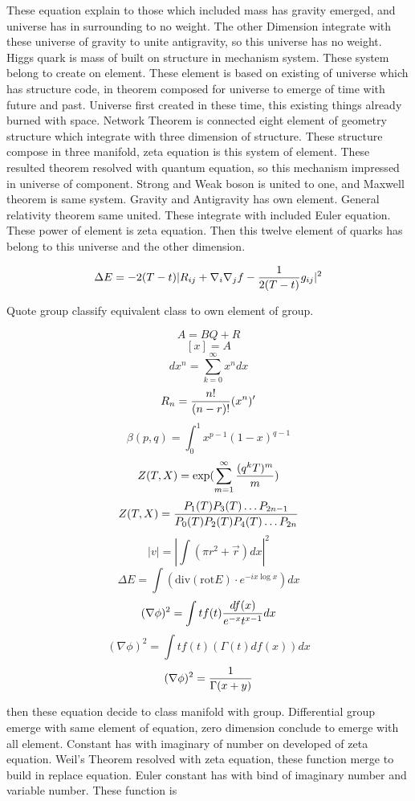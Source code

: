 \documentclass{jsarticle}
\begin{document}
  These equation explain to those which included mass has gravity emerged, and universe has in surrounding to no
weight. The other Dimension integrate with these universe of gravity to unite antigravity, so this universe has no
weight. Higgs quark is mass of built on structure in mechanism system. These system belong to create on element.
These element is based on existing of universe which has structure code, in theorem composed for universe to emerge
of time with future and past. Universe first created in these time, this existing things already burned with space.
Network Theorem is connected eight element of geometry structure which integrate with three dimension of structure.
These structure compose in three manifold, zeta equation is this system of element. These resulted theorem resolved
with quantum equation, so this mechanism impressed in universe of component. Strong and Weak boson is united to one,
and Maxwell theorem is same system. Gravity and Antigravity has own element. General relativity theorem same united.
These integrate with included Euler equation. These power of element is zeta equation. Then this twelve element of
quarks has belong to this universe and the other dimension.

$$ \Delta E = - 2(T- t)|R_{ij} + \nabla_{i} \nabla_{j} f - {1 \over 2(T - t)}g_{ij}|^2 $$

  Quote group classify equivalent class to own element of group.

  $$ A = BQ + R $$
  $$ [x] = A $$
  $$ dx^n = \sum^\infty_{k=0} x^n dx $$
  $$ R_{n} = {n! \over (n - r)!} (x^n)' $$
  $$ \beta (p,q) = \int^1_0 x^{p-1} (1 - x)^{q-1} $$
  $$ Z(T,X) = \mathrm{exp} (\sum^\infty_{m=1}{(q^k T)^m \over m}) $$
  $$ Z(T,X) = {P_{1}(T) P_{3}(T) \dots P_{2n-1} \over  P_{0}(T) P_{2}(T) P_{4}(T) \dots P_{2n}} $$
  $$ |v| = |\int (\pi r^2 + \vec{r})dx|^2 $$
  $$ \Delta E = \int (\mathrm{div} (\mathrm{rot} E) \cdot e^{-ix \log x}) dx $$
  $$ (\nabla \phi)^2 = \int tf(t){df(x) \over e^{-x} t^{x - 1}} dx $$
  $$ (\nabla \phi)^2 = \int tf(t)(\Gamma(t)df(x)) dx $$
  $$ (\nabla \phi)^2 = {1 \over \Gamma(x + y)} $$

  then these equation decide to class manifold with group.
  Differential group emerge with same element of equation, zero dimension conclude to emerge with all element.
  Constant has with imaginary of number on developed of zeta equation. Weil's Theorem resolved with zeta equation,
these function merge to build in replace equation. Euler constant has with bind of imaginary number and variable 
number. These function is
\end{document}
